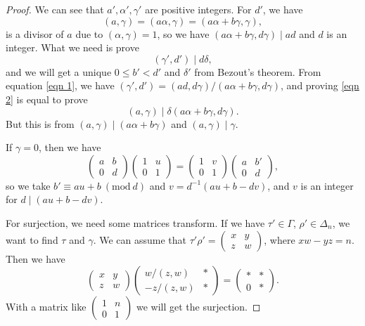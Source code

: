 \documentclass{article}
\newcommand{\Mod}[1]{\ (\mathrm{mod}\ #1)}
\begin{document}
\begin{proof}
    We can see that $a',\alpha',\gamma'$ are positive integers. For $d'$, we have \[(a,\gamma)=(a\alpha,\gamma)=(a\alpha+b\gamma,\gamma),\]is a divisor of $a$ due to $(\alpha,\gamma)=1$, so we have $(a\alpha+b\gamma,d\gamma)\mid ad$ and $d$ is an integer. What we need is prove \begin{equation}\label{eqn 2}
        (\gamma',d')\mid d\delta,
    \end{equation} and we will get a unique $0 \leq b'<d'$ and $\delta'$ from Bezout's theorem. From equation \ref{eqn 1}, we have $(\gamma',d')=(ad,d\gamma)/(a\alpha+b\gamma,d\gamma)$, and proving \ref{eqn 2} is equal to prove \[(a,\gamma)\mid \delta(a\alpha+b\gamma,d\gamma).\] But this is from $(a,\gamma)\mid (a\alpha+b\gamma)$ and $(a,\gamma)\mid \gamma$.

    If $\gamma=0$, then we have 
    \[\begin{pmatrix}
        a&b\\
        0&d
    \end{pmatrix}\begin{pmatrix}
        1&u\\
        0&1
    \end{pmatrix}=
    \begin{pmatrix}
        1&v\\
        0&1
    \end{pmatrix}
    \begin{pmatrix}
        a&b'\\
        0&d
    \end{pmatrix},\]
    so we take $b'\equiv au+b\Mod{d}$ and $v=d^{-1}(au+b-dv)$, and $v$ is an integer for $d\mid (au+b-dv)$.

    For surjection, we need some matrices transform. If we have $\tau'\in \Gamma$, $\rho'\in \Delta_n$, we want to find $\tau$ and $\gamma$. We can assume that $\tau'\rho'=\begin{pmatrix}
        x&y\\
        z&w
    \end{pmatrix}$, where $xw-yz=n$. Then we have 
    \[
    \begin{pmatrix}
        x&y\\
        z&w
    \end{pmatrix}
    \begin{pmatrix}
        w/(z,w)&*\\
        -z/(z,w)&*
    \end{pmatrix}=
    \begin{pmatrix}
        *&*\\
        0&*
    \end{pmatrix}.
    \]With a matrix like $\begin{pmatrix}
        1&n\\
        0&1
    \end{pmatrix}$ we will get the surjection.
\end{proof}
\end{document}
